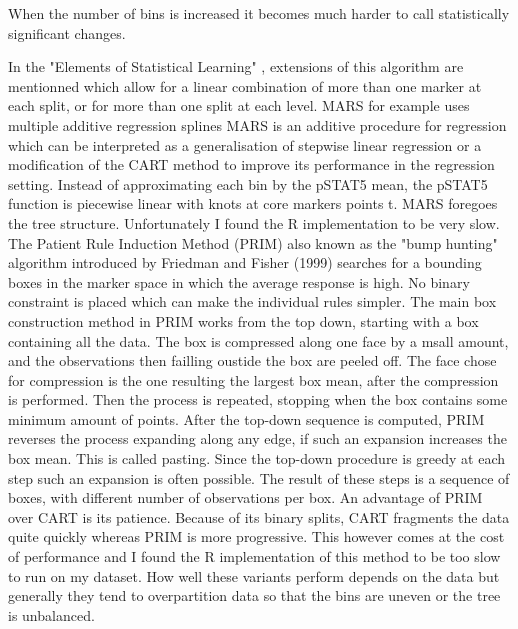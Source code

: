 When the number of bins is increased it becomes much harder to call statistically significant changes.


In the "Elements of Statistical Learning" \cite{Anonymous:ikywRZeA},
extensions of this algorithm are mentionned which allow for a linear combination of more than one marker at each split,
or for more than one split at each level.
MARS for example uses multiple additive regression splines
MARS is an additive procedure for regression  which can be interpreted as a generalisation of stepwise linear regression
or a modification of the CART method to improve its performance in the regression setting.
Instead of approximating each bin by the pSTAT5 mean, the pSTAT5 function is piecewise linear with knots at core markers
points t.
MARS foregoes the tree structure.
Unfortunately I found the R implementation to be very slow.
The Patient Rule Induction Method (PRIM) also known as the "bump hunting" algorithm
introduced by Friedman and Fisher (1999)
searches for a bounding boxes in the marker space in which the average response is high.
No binary constraint is placed which can make the individual rules simpler.
The main box construction method in PRIM works from the top down,
starting with a box containing all the data.
The box is compressed along one face by a msall amount, and the observations then failling oustide the box are peeled off.
The face chose for compression is the one resulting the largest box mean, after the compression is performed.
Then the process is repeated, stopping when the box contains some minimum amount of points.
After the top-down sequence is computed, PRIM reverses the process expanding along any edge, if such an expansion
increases the box mean. This is called pasting.  Since the top-down procedure is greedy at each step such an
expansion is often possible.
The result of these steps is a sequence of boxes, with different number of observations per box.
An advantage of PRIM over CART is its patience.  Because of its binary splits, CART fragments the data quite quickly
whereas PRIM is more progressive.
This however comes at the cost of performance and I found the R implementation of this method to be too slow to run on
my dataset.
%
How well these variants perform depends on the data but
generally they tend to overpartition data so that the bins are uneven
or the tree is unbalanced.






